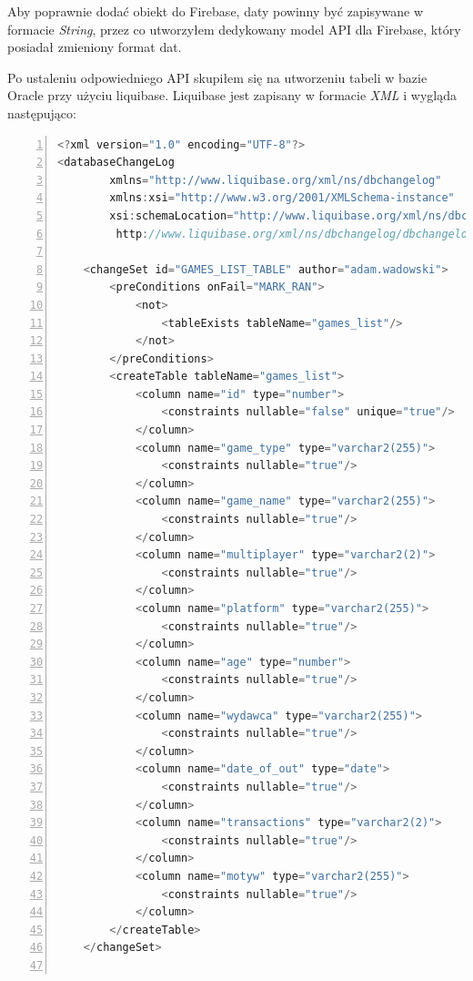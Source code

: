 Aby poprawnie dodać obiekt do Firebase, daty powinny być zapisywane w formacie \textit{String}, przez co utworzyłem dedykowany model API dla Firebase, który posiadał zmieniony format dat.

Po ustaleniu odpowiedniego API skupiłem się na utworzeniu tabeli w bazie Oracle przy użyciu liquibase. Liquibase jest zapisany w formacie \textit{XML} i wygląda następująco:
\begin{lstlisting}[language=C, mathescape, frame=single, numbers=left, xleftmargin=2em, framexleftmargin=2em, basicstyle=\ttfamily\bfseries, caption={Tworzenie tabeli przy użyciu Liquibase}, label={Tworzenie tabeli przy użyciu Liquibase}]
<?xml version="1.0" encoding="UTF-8"?>
<databaseChangeLog
        xmlns="http://www.liquibase.org/xml/ns/dbchangelog"
        xmlns:xsi="http://www.w3.org/2001/XMLSchema-instance"
        xsi:schemaLocation="http://www.liquibase.org/xml/ns/dbchangelog
         http://www.liquibase.org/xml/ns/dbchangelog/dbchangelog-3.8.xsd">

    <changeSet id="GAMES_LIST_TABLE" author="adam.wadowski">
        <preConditions onFail="MARK_RAN">
            <not>
                <tableExists tableName="games_list"/>
            </not>
        </preConditions>
        <createTable tableName="games_list">
            <column name="id" type="number">
                <constraints nullable="false" unique="true"/>
            </column>
            <column name="game_type" type="varchar2(255)">
                <constraints nullable="true"/>
            </column>
            <column name="game_name" type="varchar2(255)">
                <constraints nullable="true"/>
            </column>
            <column name="multiplayer" type="varchar2(2)">
                <constraints nullable="true"/>
            </column>
            <column name="platform" type="varchar2(255)">
                <constraints nullable="true"/>
            </column>
            <column name="age" type="number">
                <constraints nullable="true"/>
            </column>
            <column name="wydawca" type="varchar2(255)">
                <constraints nullable="true"/>
            </column>
            <column name="date_of_out" type="date">
                <constraints nullable="true"/>
            </column>
            <column name="transactions" type="varchar2(2)">
                <constraints nullable="true"/>
            </column>
            <column name="motyw" type="varchar2(255)">
                <constraints nullable="true"/>
            </column>
        </createTable>
    </changeSet>


\end{lstlisting}
